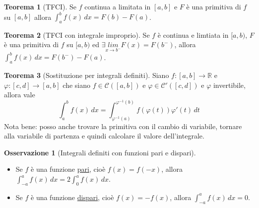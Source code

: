\documentclass{article}
\theoremstyle{definition}
\newtheorem{theorem}{Teorema}[section]
\theoremstyle{definition}
\theoremstyle{definition}
\theoremstyle{definition}
\newtheorem{remark}{Osservazione}[section]
\theoremstyle{definition}
\theoremstyle{definition}
\begin{document}
\begin{theorem}[TFCI]
    Se $f$ continua a limitata in $[a,b]$ e $F$ è una primitiva di $f$ su $[a,b]$ allora $\int_a^b f(x)\,dx = F(b)-F(a)$.
\end{theorem}

\begin{theorem}[TFCI con integrale improprio]
    Se $f$ è continua e limtiata in $[a,b)$, $F$ è una primitiva di $f$ su $[a,b)$ ed $\displaystyle{\exists \underset{x\rightarrow b^-}{lim}F(x)=F(b^-)}$, allora $\int_a^bf(x)\,dx=F(b^-)-F(a)$.
\end{theorem}

\begin{theorem}[Sostituzione per integrali definiti]
    Siano $f:[a,b]\rightarrow\mathbb{R}$ e $\varphi:[c,d]\rightarrow[a,b]$ che siano $f\in\mathcal{C}([a,b])$ e $\varphi\in\mathcal{C}'([c,d])$ e $\varphi$ invertibile, allora vale
    \[\int_a^bf(x)\,dx=\int_{\varphi^{-1}(a)}^{\varphi^{-1}(b)}f(\varphi(t))\varphi'(t)\,dt\]
    Nota bene: posso anche trovare la primitiva con il cambio di variabile, tornare alla variabile di partenza e quindi calcolare il valore dell'integrale.
\end{theorem}

\begin{remark}[Integrali definiti con funzioni pari e dispari]
    \hspace{1mm}
    \begin{itemize}
        \item Se $f$ è una funzione \underline{pari}, cioè $f(x)=f(-x)$, allora $\int_{-a}^af(x)\,dx = 2 \int_0^af(x)\,dx$.
        \item Se $f$ è una funzione \underline{dispari}, cioè $f(x)=-f(x)$, allora $\int_{-a}^af(x)\,dx = 0$.
    \end{itemize}
\end{remark}









\end{document}
